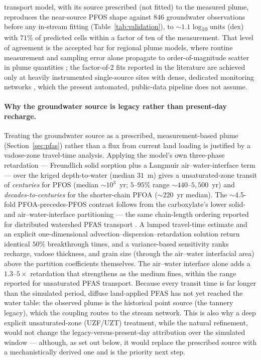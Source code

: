 transport model, with its source prescribed (not fitted) to the measured plume, reproduces the
near-source PFOS shape against $846$ groundwater observations before any in-stream fitting
(Table~\ref{tab:validation}), to $\sim$$1.1$ log\textsubscript{10} units (dex) with $71\%$ of
predicted cells within a factor of ten of the measurement. That level of agreement is the accepted
bar for regional plume models, where routine measurement and sampling error alone propagate to
order-of-magnitude scatter in plume quantities \citep{jarsjo2008}; the factor-of-2 fits reported in
the literature are achieved only at heavily instrumented single-source sites with dense, dedicated
monitoring networks \citep{shin2011}, which the present automated, public-data pipeline does not
assume.

\paragraph{Why the groundwater source is legacy rather than present-day recharge.} Treating the
groundwater source as a prescribed, measurement-based plume (Section~\ref{sec:pfas}) rather than a
flux from current land loading is justified by a vadose-zone travel-time analysis. Applying the
model's own three-phase retardation --- Freundlich solid sorption plus a Langmuir air--water-interface
term --- over the kriged depth-to-water (median $31$~m) gives a unsaturated-zone transit of
\emph{centuries} for PFOS (median $\sim$$10^{3}$~yr; $5$--$95\%$ range $\sim$$440$--$5{,}500$~yr) and
\emph{decades-to-centuries} for the shorter-chain PFOA ($\sim$$220$~yr median). The $\sim$4.5-fold
PFOA-precedes-PFOS contrast follows from the carboxylate's lower solid- and air--water-interface
partitioning --- the same chain-length ordering reported for distributed watershed PFAS transport
\citep{rafiei2023pfas}. A lumped travel-time estimate and an explicit one-dimensional
advection--dispersion--retardation solution return identical $50\%$ breakthrough times, and a
variance-based sensitivity ranks recharge, vadose thickness, and grain size (through the air--water
interfacial area) above the partition coefficients themselves. The air--water interface alone adds a
$1.3$--$5\times$ retardation that strengthens as the medium fines, within the range reported for
unsaturated PFAS transport. Because every transit time is far longer than the simulated period,
diffuse land-applied PFAS has not yet reached the water table: the observed plume is the historical
point source (the tannery legacy), which the coupling routes to the stream network. This is also why
a deep explicit unsaturated-zone (UZF/UZT) treatment, while the natural refinement, would not change
the legacy-versus-present-day attribution over the simulated window --- although, as set out below, it
would replace the prescribed source with a mechanistically derived one and is the priority next step.

